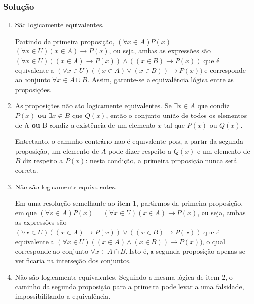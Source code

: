 \documentclass[12pt, letterpaper]{report}
\newcommand*{\soln}[1]{\subsubsection*{#1}}
\newcommand*{\solution}{\soln{Solução}}
\begin{document}
\solution
  \begin{enumerate}[label=\arabic*.]
      \item São logicamente equivalentes. 

      Partindo da primeira proposição, $(\forall x \in A) P(x)$ = $(\forall x \in U) (x \in A) \rightarrow P(x)$, ou seja, ambas as expressões são $(\forall x \in U) ((x \in A) \rightarrow P(x)) \land ((x \in B) \rightarrow P(x))$ que é equivalente a 
      $(\forall x \in U) ((x \in A) \lor (x \in B)) \rightarrow P(x))$ e corresponde ao conjunto $\forall x \in A \cup B$. Assim, garante-se a equivalência lógica entre as proposições.


      \item As proposições não são logicamente equivalentes. Se $ \exists x \in A $ que condiz $P(x)$ \textbf{ou} $\exists x \in B$ que $Q(x)$, então o conjunto união de todos os elementos de A \textbf{ou} B condiz a existência de um elemento $x$ tal que $P(x)$ ou $Q(x)$. 

      Entretanto, o caminho contrário não é equivalente pois, a partir da segunda proposição, um elemento de $A$ pode dizer respeito a $Q(x)$ e um elemento de $B$ diz respeito a $P(x)$: nesta condição, a primeira proposição nunca será correta. 

      \item Não são logicamente equivalentes. 

      Em uma resolução semelhante ao item 1, partirmos da primeira proposição, em que $(\forall x \in A) P(x)$ = $(\forall x \in U) (x \in A) \rightarrow P(x)$, ou seja, ambas as expressões são $(\forall x \in U) ((x \in A) \rightarrow P(x)) \lor ((x \in B) \rightarrow P(x))$ que é equivalente a $(\forall x \in U) ((x \in A) \land (x \in B)) \rightarrow P(x))$, o qual corresponde ao conjunto $\forall x \in A \cap B$. Isto é, a segunda proposição apenas se verificaria na interseção dos conjuntos.


      \item Não são logicamente equivalentes. Seguindo a mesma lógica do item 2, o caminho da segunda proposição para a primeira pode levar a uma falsidade, impossibilitando a equivalência.
  \end{enumerate}
\end{document}
